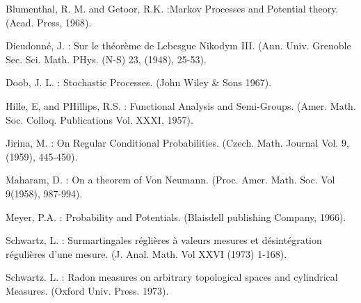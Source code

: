 \begin{thebibliography}{99}
 Blumenthal, R. M. and Getoor, R.K. :\pageoriginale Markov Processes
  and Potential theory. (Acad. Press, 1968).

 Dieudonn\'e, J. : Sur le th\'eor\`eme de Lebesgue
  Nikodym III. (Ann. Univ. Grenoble Sec. Sci. Math. PHys. (N-S) 23,
  (1948), 25-53). 

 Doob, J. L. : Stochastic Processes. (John Wiley \& Sons
  1967).

 Hille, E, and PHillips, R.S. : Functional Analysis and
  Semi-Groups. (Amer. Math. Soc. Colloq. Publications Vol. XXXI,
  1957). 

 Jirina, M. : On Regular Conditional
  Probabilities. (Czech. Math. Journal Vol. 9, (1959), 445-450).

 Maharam, D. : On a theorem of Von
  Neumann. (Proc. Amer. Math. Soc. Vol 9(1958), 987-994). 

 Meyer, P.A. : Probability and Potentials. (Blaisdell
  publishing Company, 1966).

 Schwartz, L. : Surmartingales r\'egli\`eres \`a valeurs
  mesures et d\'esint\'egration r\'eguli\`eres d'une
  mesure. (J. Anal. Math. Vol XXVI (1973) 1-168).

 Schwartz. L. : Radon measures on arbitrary topological
  spaces and cylindrical Measures. (Oxford Univ. Press. 1973).

\end{thebibliography}
